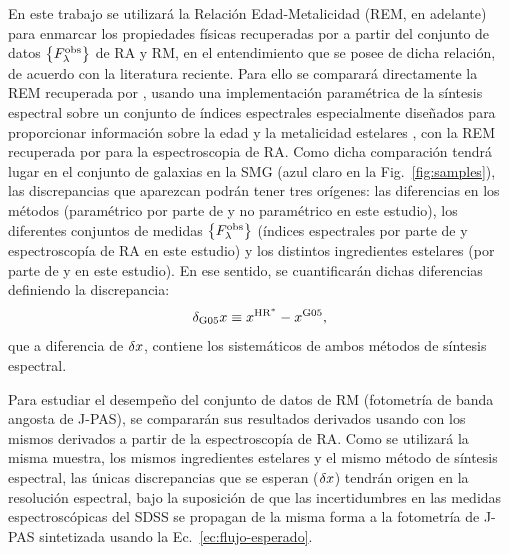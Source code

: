 En este trabajo se utilizará la Relación Edad-Metalicidad (REM, en adelante) para enmarcar los
propiedades físicas recuperadas por \dynbas a partir del conjunto de datos $\set{\sedt[F]{obs}}$ de
RA y RM, en el entendimiento que se posee de dicha relación, de acuerdo con la literatura reciente.
Para ello se comparará directamente la REM recuperada por , usando una
implementación paramétrica de la síntesis espectral sobre un conjunto de índices espectrales
especialmente diseñados para proporcionar información sobre la edad y la metalicidad estelares
\citep{Worthey1994}, con la REM recuperada por \dynbas para la espectroscopia de RA. Como dicha
comparación tendrá lugar en el conjunto de galaxias en la SMG (azul claro en la
Fig.~\ref{fig:samples}), las discrepancias que aparezcan podrán tener tres orígenes: las diferencias
en los métodos (paramétrico por parte de \gal y no paramétrico en este estudio), los diferentes
conjuntos de medidas $\set{\sedt[F]{obs}}$ (índices espectrales por parte de \gal y espectroscopía
de RA en este estudio) y los distintos ingredientes estelares (\bc por parte de \gal y  en
este estudio). En ese sentido, se cuantificarán dichas diferencias definiendo la discrepancia:
%
\begin{equation}
\dig{x} \equiv x^{\text{HR}^*} - x^\text{G05},
\end{equation}
%
que a diferencia de $\dis{x}$, contiene los sistemáticos de ambos métodos de síntesis espectral.

Para estudiar el desempeño del conjunto de datos de RM (fotometría de banda angosta de J-PAS), se
compararán sus resultados derivados usando \dynbas con los mismos derivados a partir de la
espectroscopía de RA. Como se utilizará la misma muestra, los mismos ingredientes estelares y el
mismo método de síntesis espectral, las únicas discrepancias que se esperan ($\dis{x}$) tendrán
origen en la resolución espectral, bajo la suposición de que las incertidumbres en las medidas
espectroscópicas del SDSS se propagan de la misma forma a la fotometría de J-PAS sintetizada usando
la Ec.~\eqref{ec:flujo-esperado}.
